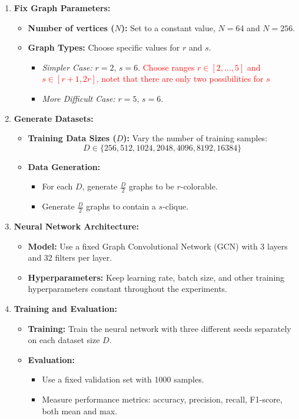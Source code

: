 \begin{enumerate}
    \item \textbf{Fix Graph Parameters:}
    \begin{itemize}
        \item \textbf{Number of vertices ($N$):} Set to a constant value, $N = 64$ and $N=256$.
        \item \textbf{Graph Types:} Choose specific values for $r$ and $s$.
        \begin{itemize}
            \item \textit{Simpler Case:} $r = 2$, $s = 6$. \textcolor{red}{Choose ranges $r\in [2,...,5]$ and $s\in [r+1,2r]$, notet that there are only two possibilities for $s$}
            \item \textit{More Difficult Case:} $r = 5$, $s = 6$. 
        \end{itemize}
    \end{itemize}
    \item \textbf{Generate Datasets:}
    \begin{itemize}
        \item \textbf{Training Data Sizes ($D$):} Vary the number of training samples:
        \[
        D \in \{256, 512, 1024, 2048, 4096, 8192,16384\}
        \]
        \item \textbf{Data Generation:}
        \begin{itemize}
            \item For each $D$, generate $\frac{D}{2}$ graphs to be $r$-colorable.
            \item Generate $\frac{D}{2}$ graphs to contain a $s$-clique.
        \end{itemize}
    \end{itemize}
    \item \textbf{Neural Network Architecture:}
    \begin{itemize}
        \item \textbf{Model:} Use a fixed Graph Convolutional Network (GCN) with 3 layers and 32 filters per layer.
        \item \textbf{Hyperparameters:} Keep learning rate, batch size, and other training hyperparameters constant throughout the experiments.
    \end{itemize}
    \item \textbf{Training and Evaluation:}
    \begin{itemize}
        \item \textbf{Training:} Train the neural network with three different seeds separately on each dataset size $D$.
        \item \textbf{Evaluation:}
        \begin{itemize}
            \item Use a fixed validation set with 1000 samples.
            \item Measure performance metrics: accuracy, precision, recall, F1-score, both mean and max.
        \end{itemize}
    \end{itemize}
\end{enumerate}

